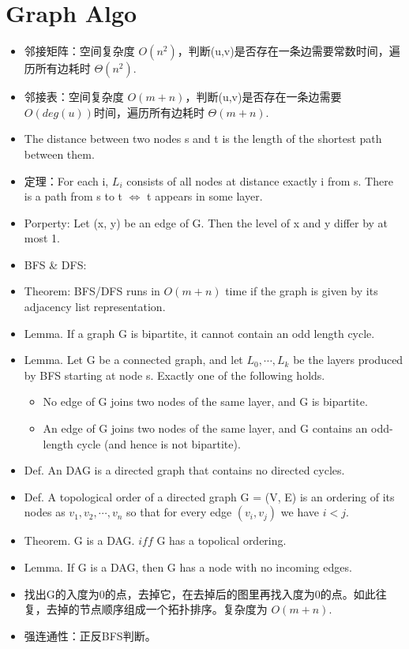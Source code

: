 \documentclass[10pt,a4paper,twocolumn]{article}
\begin{document}
\section{Graph Algo}

\begin{itemize}
  \item 邻接矩阵：空间复杂度 \(O(n^2)\)，判断(u,v)是否存在一条边需要常数时间，遍历所有边耗时 \(\Theta(n^2)\).
  \item 邻接表：空间复杂度 \(O(m+n)\)，判断(u,v)是否存在一条边需要 \(O(deg(u))\)时间，遍历所有边耗时 \(\Theta(m+n)\).
  \item The distance between two nodes s and t is the length of the shortest path between them.
  \item{定理：}For each i, \(L_i\) consists of all nodes at distance exactly i from s. There is a path from s to t \(\iff\) t appears in some layer.
  \item{Porperty: }Let (x, y) be an edge of G. Then the level of x and y differ by at most 1.
  \item{BFS \& DFS: }
  \item{Theorem: }BFS/DFS runs in \(O(m + n)\) time if the graph is given by its adjacency list representation.
  \item Lemma. If a graph G is bipartite, it cannot contain an odd length cycle.
  \item{
    Lemma. Let G be a connected graph, and let \(L_0,\cdots,L_k\) be the layers produced by BFS starting at node s. Exactly one of the following holds.
    \begin{itemize}
      \item No edge of G joins two nodes of the same layer, and G is bipartite.
      \item An edge of G joins two nodes of the same layer, and G contains an odd-length cycle (and hence is not bipartite).
    \end{itemize}
  }
  \item Def. An DAG is a directed graph that contains no directed cycles.
  \item Def. A topological order of a directed graph G = (V, E) is an ordering of its nodes as \(v_1,v_2,\cdots,v_n\) so that for every edge \((v_i,v_j)\) we have \(i<j\).
  \item{Theorem. }G is a DAG. \(iff\) G has a topolical ordering.
  \item Lemma. If G is a DAG, then G has a node with no incoming edges.
  \item 找出G的入度为0的点，去掉它，在去掉后的图里再找入度为0的点。如此往复，去掉的节点顺序组成一个拓扑排序。复杂度为 \(O(m+n)\).
  \item 强连通性：正反BFS判断。
\end{itemize}
\end{document}
